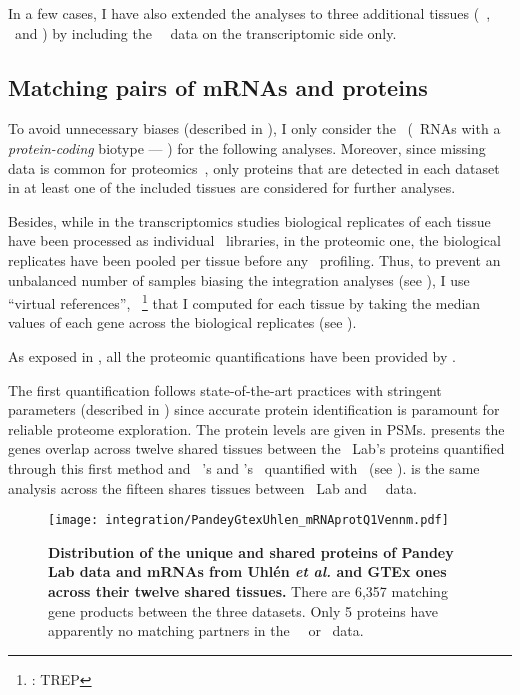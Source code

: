 In a few cases, I have also extended the analyses
to three additional tissues (\ie\ \Gall, \Placenta\ and \Rectum)
by including the \uhlen\ \etal\ data on the transcriptomic side only.\mybr\

\subsection{Matching pairs of mRNAs and proteins}
To avoid unnecessary biases (described in ),
I only consider the \mRNAs\
(\ie\ \glspl{RNA} with a \emph{protein-coding} biotype --- )
for the following analyses.
Moreover, since missing data is common for proteomics~,
only proteins that are detected in each dataset
in at least one of the included tissues
are considered for further analyses.\mybr\

Besides,
while in the transcriptomics studies
biological replicates of each tissue have been processed
as individual \Rnaseq\ libraries,
in the proteomic one,
the biological replicates have been pooled per tissue before any \ms\ profiling.
Thus, to prevent an unbalanced number of samples biasing
the integration analyses (see ),
I use \enquote{virtual references},
\ie\ \treps\footnote{\trep{}: \glsdesc{TREP}}
that I computed for each tissue
by taking the median values of each gene
across the biological replicates
(see ).\mybr\

As exposed in ,
all the proteomic quantifications have been provided by \james.\mybr\

The first quantification follows state-of-the-art practices
with stringent parameters (described in )
since accurate protein identification is paramount
for reliable proteome exploration.
The protein levels are given in \glspl{PSM}.
 presents
the genes overlap across twelve shared tissues
between the \pandey\ Lab's proteins quantified through this first method
and \uhlen\ \etal{}'s and \gtex{}'s \mRNAs\ quantified
with \htseq\ (see ).
 is the same analysis across the fifteen shares tissues
between \pandey\ Lab and \uhlen\ \etal\ data.\mybr\
\vspace{5mm}

\begin{figure}[!htb]
    \texttt{[image: integration/PandeyGtexUhlen\_mRNAprotQ1Vennm.pdf]}\centering
    \caption[Distribution of the unique and shared proteins/mRNAs for the three datasets
    across twelve tissues]{%
    \label{fig:PGU_vennQ1}\textbf{Distribution of the unique and shared proteins
    of Pandey Lab data and mRNAs from Uhlén \textit{et al.} and GTEx ones across
    their twelve shared tissues.}
    There are 6,357 matching gene products between the three datasets.
    Only 5 proteins have apparently no matching partners
    in the \uhlen\ \etal\ or \gtex\ data.}
\end{figure}


